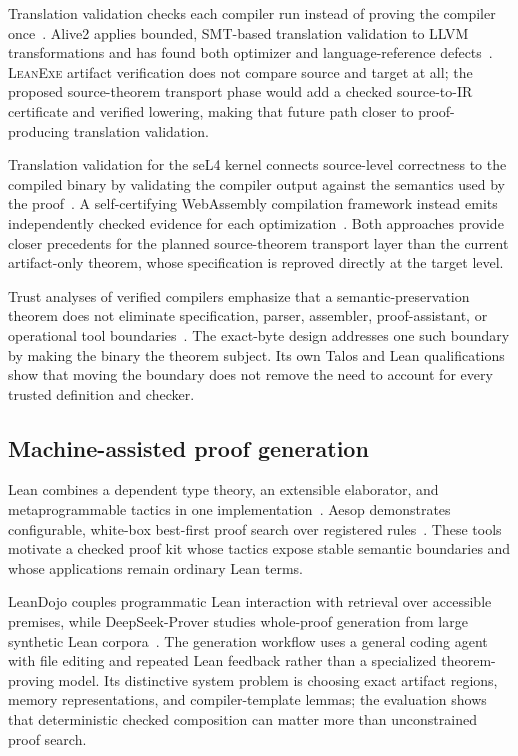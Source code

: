 \documentclass[11pt]{article}
\newcommand{\leanexe}{\textsc{LeanExe}}
\begin{document}
Translation validation checks each compiler run instead of proving the compiler once~\cite{Pnueli1998TranslationValidation}.  Alive2 applies bounded, SMT-based translation validation to LLVM transformations and has found both optimizer and language-reference defects~\cite{Lopes2021Alive2}.  \leanexe{} artifact verification does not compare source and target at all; the proposed source-theorem transport phase would add a checked source-to-IR certificate and verified lowering, making that future path closer to proof-producing translation validation.

Translation validation for the seL4 kernel connects source-level correctness to the compiled binary by validating the compiler output against the semantics used by the proof~\cite{Sewell2013KernelBinary}.  A self-certifying WebAssembly compilation framework instead emits independently checked evidence for each optimization~\cite{Namjoshi2021SelfCertifying}.  Both approaches provide closer precedents for the planned source-theorem transport layer than the current artifact-only theorem, whose specification is reproved directly at the target level.

Trust analyses of verified compilers emphasize that a semantic-preservation theorem does not eliminate specification, parser, assembler, proof-assistant, or operational tool boundaries~\cite{Monniaux2022CompCertTCB}.  The exact-byte design addresses one such boundary by making the binary the theorem subject.  Its own Talos and Lean qualifications show that moving the boundary does not remove the need to account for every trusted definition and checker.

\subsection{Machine-assisted proof generation}

Lean combines a dependent type theory, an extensible elaborator, and metaprogrammable tactics in one implementation~\cite{deMoura2021Lean4}.  Aesop demonstrates configurable, white-box best-first proof search over registered rules~\cite{Limperg2023Aesop}.  These tools motivate a checked proof kit whose tactics expose stable semantic boundaries and whose applications remain ordinary Lean terms.

LeanDojo couples programmatic Lean interaction with retrieval over accessible premises, while DeepSeek-Prover studies whole-proof generation from large synthetic Lean corpora~\cite{Yang2023LeanDojo,Xin2024DeepSeekProver}.  The generation workflow uses a general coding agent with file editing and repeated Lean feedback rather than a specialized theorem-proving model.  Its distinctive system problem is choosing exact artifact regions, memory representations, and compiler-template lemmas; the evaluation shows that deterministic checked composition can matter more than unconstrained proof search.
\end{document}
